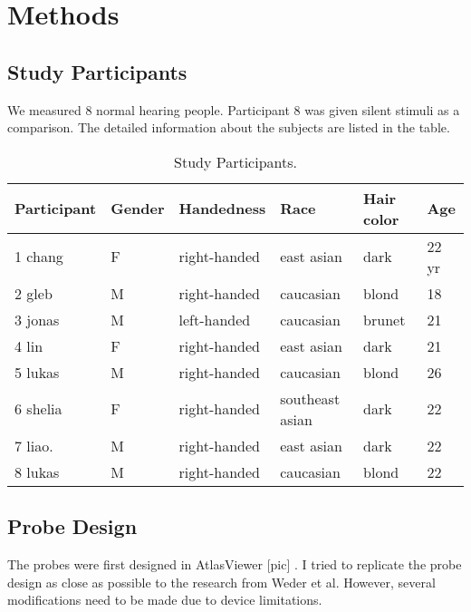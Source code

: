 \chapter{Methods}
\section {Study Participants}
We measured 8 normal hearing people. Participant 8 was given silent stimuli as a comparison. The detailed information about the subjects are listed in the table.

\begin{table}[h!]
  \begin{center}
    
    
    \begin{tabular}{p{2.3cm} | p{1.5cm} |p{3cm} | p{3cm} | p{2.5cm} | p{1cm}} %
      \textbf{Participant} & \textbf {Gender}& \textbf{Handedness} & \textbf{Race} & \textbf{Hair color} &\textbf {Age}\\ 
      \hline
      1 chang  & F & right-handed & east asian & dark & 22 yr \\
      2 gleb    & M & right-handed  & caucasian & blond & 18 \\
      3 jonas  & M & left-handed &  caucasian & brunet & 21\\
      4 lin      & F  & right-handed & east asian & dark& 21 \\
      5 lukas & M & right-handed  &  caucasian& blond & 26 \\
      6 shelia&  F & right-handed & southeast asian & dark & 22 \\
      7 liao.   &  M & right-handed &  east asian & dark & 22 \\
      8 lukas & M & right-handed  & caucasian & blond & 22 \\
    \end{tabular}
    \label{tab:table1}
    \caption{Study Participants.}
  \end{center}
  
\end{table}

\section {Probe Design}
The probes were first designed in AtlasViewer [pic] \cite {10.1117/1.NPh.2.2.020801}. I tried to replicate the probe design as close as possible to the research from Weder et al. However, several modifications need to be made due to device limitations.

